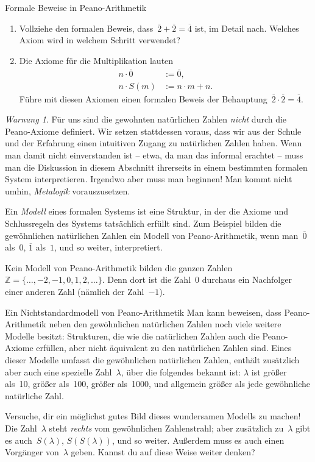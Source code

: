 \documentclass[twoside]{../zirkelblatt1415}
\newcommand{\ZZ}{\mathbb{Z}}
\theoremstyle{definition}
\theoremstyle{plain}
\theoremstyle{remark}
\newtheorem{warnung}[defn]{Warnung}
\newcommand{\ol}[1]{\overline{#1}}
\begin{document}
\begin{aufgabe}{Formale Beweise in Peano-Arithmetik}
\begin{enumerate}
\item Vollziehe den formalen Beweis, dass~$\ol{2} + \ol{2} = \ol{4}$ ist, im Detail nach. Welches
Axiom wird in welchem Schritt verwendet?
\item Die Axiome für die Multiplikation lauten
\begin{align*}
  n \cdot \ol{0} &:= \ol{0}, \\
  n \cdot S(m) &:= n \cdot m + n.
\end{align*}
Führe mit diesen Axiomen einen formalen Beweis der Behauptung~$\ol{2} \cdot \ol{2} = \ol{4}$.
\end{enumerate}\fixlistspacing
\end{aufgabe}

\begin{warnung}Für uns sind die gewohnten natürlichen Zahlen \emph{nicht} durch
die Peano-Axiome definiert. Wir setzen stattdessen voraus, dass wir aus der
Schule und der Erfahrung einen intuitiven Zugang zu natürlichen Zahlen haben.
Wenn man damit nicht einverstanden ist -- etwa, da man das informal erachtet --
muss man die Diskussion in diesem Abschnitt ihrerseits in einem bestimmten formalen
System interpretieren. Irgendwo aber muss man beginnen! Man kommt nicht umhin,
\emph{Metalogik} vorauszusetzen.
\end{warnung}

Ein \emph{Modell} eines formalen Systems ist eine Struktur, in der die Axiome
und Schlussregeln des Systems tatsächlich erfüllt sind. Zum Beispiel bilden die
gewöhnlichen natürlichen Zahlen ein Modell von Peano-Arithmetik, wenn
man~$\ol{0}$ als~$0$, $\ol{1}$ als~$1$, und so weiter, interpretiert.

Kein Modell von Peano-Arithmetik bilden die ganzen Zahlen~$\ZZ = \{
\ldots,-2,-1,0,1,2,\ldots \}$. Denn dort ist die Zahl~$0$ durchaus ein
Nachfolger einer anderen Zahl (nämlich der Zahl~$-1$).

\begin{aufgabe}{Ein Nichtstandardmodell von Peano-Arithmetik}
Man kann beweisen, dass Peano-Arithmetik neben den gewöhnlichen natürlichen
Zahlen noch viele weitere Modelle besitzt: Strukturen, die wie die natürlichen
Zahlen auch die Peano-Axiome erfüllen, aber nicht äquivalent zu den natürlichen
Zahlen sind. Eines dieser Modelle umfasst die gewöhnlichen natürlichen Zahlen,
enthält zusätzlich aber auch eine spezielle Zahl~$\lambda$, über die
folgendes bekannt ist: $\lambda$ ist größer als~10, größer als~100, größer
als~1000, und allgemein größer als jede gewöhnliche natürliche Zahl.

Versuche, dir ein möglichst gutes Bild dieses wundersamen Modells zu machen!
Die Zahl~$\lambda$ steht \emph{rechts} vom gewöhnlichen Zahlenstrahl; aber
zusätzlich zu~$\lambda$ gibt es auch~$S(\lambda)$, $S(S(\lambda))$, und so
weiter. Außerdem muss es auch einen Vorgänger von~$\lambda$ geben. Kannst du
auf diese Weise weiter denken?
\end{aufgabe}
\end{document}

